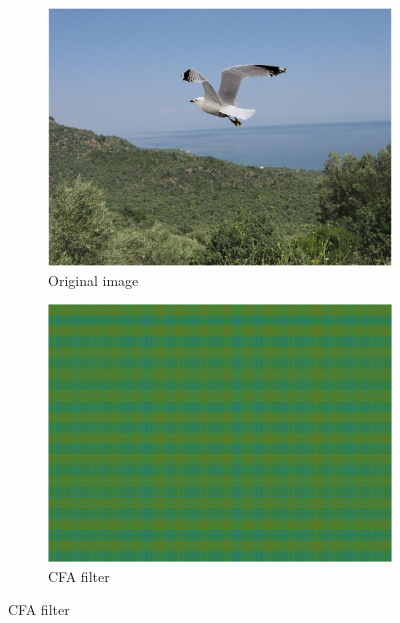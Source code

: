 \documentclass{template/acm_proc_article-sp}
\begin{document}
\begin{figure}[H]
\centering

\begin{subfigure}{0.23\textwidth}
    \includegraphics[trim=0 0 0 0,clip,width=\linewidth]{report/results/f1_steps_0.jpg}
    \caption{Original image}
\end{subfigure}
\hspace*{\fill}
\begin{subfigure}{0.23\textwidth}
    \includegraphics[trim=0 0 0 0,clip,width=\linewidth]{report/results/f1_steps_1.jpg}
    \caption{CFA filter}
\end{subfigure}


\end{figure}
\end{document}
